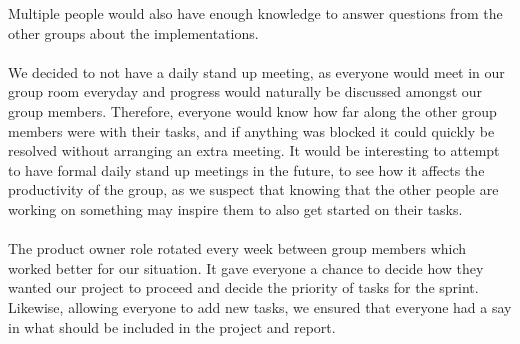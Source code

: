 Multiple people would also have enough knowledge to answer questions from the other groups about the implementations.
\\\\
We decided to not have a daily stand up meeting, as everyone would meet in our group room everyday and progress would naturally be discussed amongst our group members.
Therefore, everyone would know how far along the other group members were with their tasks, and if anything was blocked it could quickly be resolved without arranging an extra meeting.
It would be interesting to attempt to have formal daily stand up meetings in the future, to see how it affects the productivity of the group, as we suspect that knowing that the other people are working on something may inspire them to also get started on their tasks.
\\\\
The product owner role rotated every week between group members which worked better for our situation. 
It gave everyone a chance to decide how they wanted our project to proceed and decide the priority of tasks for the sprint.
Likewise, allowing everyone to add new tasks, we ensured that everyone had a say in what should be included in the project and report.
